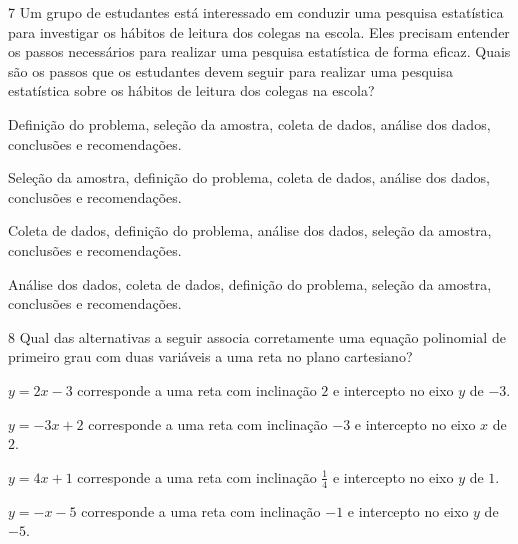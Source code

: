 
\num{7} Um grupo de estudantes está interessado em conduzir uma pesquisa
estatística para investigar os hábitos de leitura dos colegas na escola.
Eles precisam entender os passos necessários para realizar uma pesquisa
estatística de forma eficaz. Quais são os passos que os estudantes devem
seguir para realizar uma pesquisa estatística sobre os hábitos de leitura
dos colegas na escola?

\begin{escolha}
\item Definição do problema, seleção da amostra, coleta de dados, análise
dos dados, conclusões e recomendações.
\item Seleção da amostra, definição do problema, coleta de dados, análise
dos dados, conclusões e recomendações.
\item Coleta de dados, definição do problema, análise dos dados, seleção da
amostra, conclusões e recomendações.
\item Análise dos dados, coleta de dados, definição do problema, seleção da
amostra, conclusões e recomendações.
\end{escolha}



\pagebreak
\num{8}  Qual das alternativas a seguir associa corretamente uma equação
polinomial de primeiro grau com duas variáveis a uma reta no plano cartesiano?

\begin{escolha}
\item $y = 2x - 3$ corresponde a uma reta com inclinação $2$ e intercepto no eixo $y$ de $-3$.
\item $y = -3x + 2$ corresponde a uma reta com inclinação $-3$ e intercepto no eixo $x$ de $2$.
\item $y = 4x + 1$ corresponde a uma reta com inclinação $\frac{1}{4}$ e intercepto no eixo $y$ de $1$.
\item $y = -x - 5$ corresponde a uma reta com inclinação $-1$ e intercepto no eixo $y$ de $-5$.
\end{escolha}

